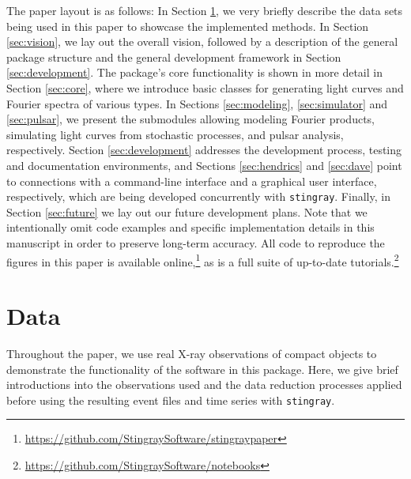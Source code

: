 \documentclass[twocolumn]{aastex62}
\newcommand{\stingray}{\texttt{stingray}\xspace}
\begin{document}
The paper layout is as follows: 
In Section \ref{sec:data}, we very briefly describe the data sets being used in this paper to showcase the implemented methods. 
In Section \ref{sec:vision}, we lay out the overall vision, followed by a description of the general package structure and the general development framework in Section \ref{sec:development}. 
The package's core functionality is shown in more detail in Section \ref{sec:core}, where we introduce basic classes for generating light curves and Fourier spectra of various types.
In Sections \ref{sec:modeling}, \ref{sec:simulator} and \ref{sec:pulsar}, we present the submodules allowing modeling Fourier products, simulating light curves from stochastic processes, and pulsar analysis, respectively.
Section \ref{sec:development} addresses the development process, testing and documentation environments, and Sections \ref{sec:hendrics} and \ref{sec:dave} point to connections with a command-line interface and a graphical user interface, respectively, which are being developed concurrently with \stingray. 
Finally, in Section \ref{sec:future} we lay out our future development plans. 
Note that we intentionally omit code examples and specific implementation details in this manuscript in order to preserve long-term accuracy. 
All code to reproduce the figures in this paper is available online,\footnote{\url{https://github.com/StingraySoftware/stingraypaper}} as is a full suite of up-to-date tutorials.\footnote{\label{foot:nb}\url{https://github.com/StingraySoftware/notebooks}}

\section{Data}
\label{sec:data}
Throughout the paper, we use real X-ray observations of compact objects to demonstrate the functionality of the software in this package. 
Here, we give brief introductions into the observations used and the data reduction processes applied before using the resulting event files and time series with \stingray.
\end{document}
